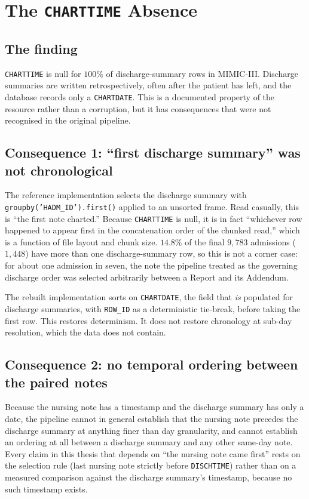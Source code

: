 \section{The \texttt{CHARTTIME} Absence}
\label{sec:charttime}

\subsection{The finding}

\texttt{CHARTTIME} is null for $100\%$ of discharge-summary rows in MIMIC-III.
Discharge summaries are written retrospectively, often after the patient has
left, and the database records only a \texttt{CHARTDATE}. This is a documented
property of the resource rather than a corruption, but it has consequences that
were not recognised in the original pipeline.

\subsection{Consequence 1: ``first discharge summary'' was not chronological}

The reference implementation selects the discharge summary with
\texttt{groupby('HADM\_ID').first()} applied to an unsorted frame. Read
casually, this is ``the first note charted.'' Because \texttt{CHARTTIME} is
null, it is in fact ``whichever row happened to appear first in the
concatenation order of the chunked read,'' which is a function of file layout
and chunk size. $14.8\%$ of the final $9{,}783$ admissions ($1{,}448$) have more than one
discharge-summary row, so this is not a corner case: for about one admission in
seven, the note the pipeline treated as the governing discharge order was
selected arbitrarily between a Report and its Addendum.

The rebuilt implementation sorts on \texttt{CHARTDATE}, the field that
\emph{is} populated for discharge summaries, with \texttt{ROW\_ID} as a
deterministic tie-break, before taking the first row. This restores determinism.
It does not restore chronology at sub-day resolution, which the data does not
contain.

\subsection{Consequence 2: no temporal ordering between the paired notes}

Because the nursing note has a timestamp and the discharge summary has only a
date, the pipeline cannot in general establish that the nursing note precedes
the discharge summary at anything finer than day granularity, and cannot
establish an ordering at all between a discharge summary and any other
same-day note. Every claim in this thesis that depends on ``the nursing note
came first'' rests on the selection rule (last nursing note strictly before
\texttt{DISCHTIME}) rather than on a measured comparison against the discharge
summary's timestamp, because no such timestamp exists.

